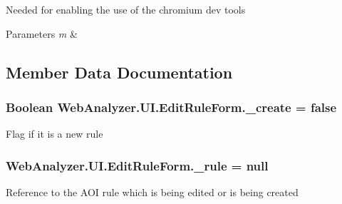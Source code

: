 Needed for enabling the use of the chromium dev tools 


\begin{DoxyParams}{Parameters}
{\em m} & \\
\hline
\end{DoxyParams}


\subsection{Member Data Documentation}
\hypertarget{class_web_analyzer_1_1_u_i_1_1_edit_rule_form_a72f32003adafdc9ead00b22eefbf647b}{}
\subsubsection[{\+\_\+create}]{\setlength{\rightskip}{0pt plus 5cm}Boolean Web\+Analyzer.\+U\+I.\+Edit\+Rule\+Form.\+\_\+create = {\bf false}\hspace{0.3cm}{\ttfamily [private]}}\label{class_web_analyzer_1_1_u_i_1_1_edit_rule_form_a72f32003adafdc9ead00b22eefbf647b}


Flag if it is a new rule 

\hypertarget{class_web_analyzer_1_1_u_i_1_1_edit_rule_form_ac499572f8fdddf891c36254e9701f754}{}
\subsubsection[{\+\_\+rule}]{ Web\+Analyzer.\+U\+I.\+Edit\+Rule\+Form.\+\_\+rule = null\hspace{0.3cm}{\ttfamily [private]}}\label{class_web_analyzer_1_1_u_i_1_1_edit_rule_form_ac499572f8fdddf891c36254e9701f754}


Reference to the A\+O\+I rule which is being edited or is being created 

\hypertarget{class_web_analyzer_1_1_u_i_1_1_edit_rule_form_ab218f619b261a307316cbb5b01a79c1b}{}

